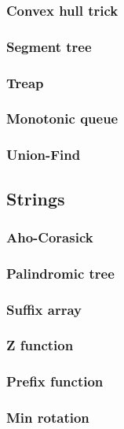 \documentclass[a4paper, twocolumn, 10pt]{report}
\begin{document}
\subsubsection*{Convex hull trick}

\subsubsection*{Segment tree}

\subsubsection*{Treap}

\subsubsection*{Monotonic queue}

\subsubsection*{Union-Find}


\newpage
\subsection*{Strings}
\subsubsection*{Aho-Corasick}

\subsubsection*{Palindromic tree}

\subsubsection*{Suffix array}

\subsubsection*{Z function}

\subsubsection*{Prefix function}

\subsubsection*{Min rotation}

\end{document}
